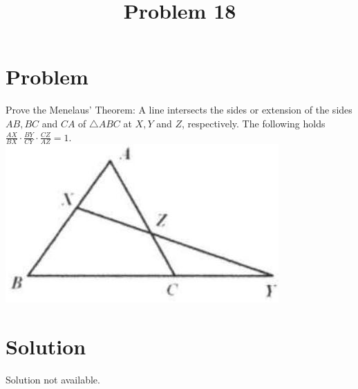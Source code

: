 \documentclass{article}
\title{Problem 18}
\date{}
\begin{document}
\maketitle

\section*{Problem}
Prove the Menelaus' Theorem: A line intersects the sides or extension of the sides \(A B, B C\) and \(C A\) of \(\triangle A B C\) at \(X, Y\) and \(Z\), respectively. The following holds \(\frac{A X}{B X} \cdot \frac{B Y}{C Y} \cdot \frac{C Z}{A Z}=1\).\\
\centering
\includegraphics[width=\textwidth]{images/091.jpg}

\section*{Solution}
Solution not available.
\end{document}

